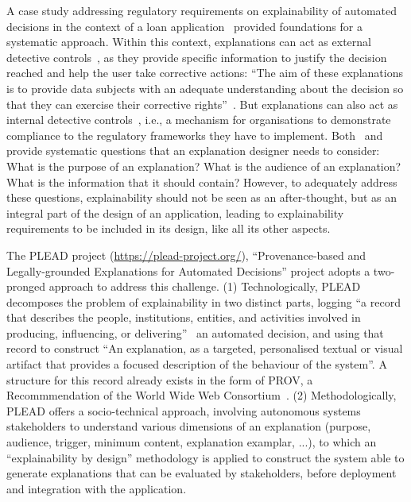 \documentclass[sigconf]{acmart}
\begin{document}
A case study addressing regulatory requirements on explainability of automated decisions in the context of a  loan application~\cite{Huynh:DGOV21} provided foundations for a systematic approach. Within this context, explanations  can act as external detective controls~\cite{Tsakalakis:CLSR21}, as they provide
specific information to justify the decision reached and help the user take corrective actions: ``The aim of these explanations is to provide data subjects with an adequate understanding about the decision so that they can exercise their corrective rights''~\cite{Tsakalakis:CLSR21}. But explanations can also act as internal detective controls~\cite{Tsakalakis:CLSR21}, i.e.,  a mechanism for organisations to demonstrate compliance to the regulatory frameworks they have to implement. 
Both~\cite{Huynh:DGOV21} and~\cite{Tsakalakis:CLSR21} provide   systematic questions that an explanation designer needs to consider: What is the purpose of an explanation? What is the audience of an explanation?  What is the information that it should contain? However, to adequately address these questions, explainability should not be seen as an after-thought, but as an integral part of the design of an application, leading to explainability requirements to be included in its design, like all its other aspects.  


The PLEAD project (\href{https://plead-project.org/}{https://plead-project.org/}), ``Provenance-based and Legally-grounded Explanations for Automated Decisions'' project adopts a two-pronged approach to address this challenge. (1) Technologically, PLEAD decomposes the problem of explainability in two distinct parts,   logging “a record that describes the people, institutions, entities, and activities involved in producing, influencing, or delivering”~\cite{Moreau:prov-dm:20130430} an automated decision, and using that record to construct ``An explanation, as a targeted, personalised textual or visual artifact that provides a focused description of the behaviour of the system''.  A structure for this record already exists in the form of  PROV, a Recommmendation of the World Wide Web Consortium~\cite{Moreau:prov-dm:20130430}.  (2) Methodologically, PLEAD offers a socio-technical approach, involving autonomous systems stakeholders to understand various dimensions of an explanation (purpose, audience, trigger, minimum content, explanation examplar, ...), to which an ``explainability by design'' methodology is applied to construct the system able to generate explanations that can be evaluated by stakeholders, before  deployment and integration with the application.
\end{document}
